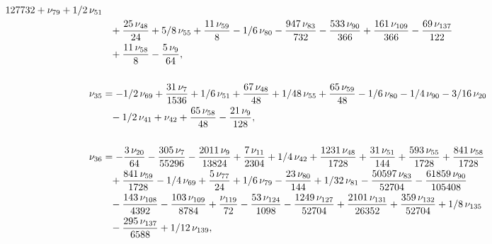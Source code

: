 \documentclass[a4paper,12pt, DIV=14, BCOR=5mm, twoside, headsepline, numbers=noenddot]{scrbook}
\begin{document}
\begin{align}
\begin{aligned}
{{{{127}}}{732}}+\nu_{{79}}+1/2\,\nu_{{51}}\\
 &\hphantom{=}+{\frac {25\,\nu_{{48}}}{24}}+
5/8\,\nu_{{55}}+{\frac {11\,\nu_{{59}}}{8}}-1/6\,\nu_{{80}}-{\frac {
947\,\nu_{{83}}}{732}}-{\frac {533\,\nu_{{90}}}{366}}+{\frac {161\,\nu
_{{109}}}{366}}-{\frac {69\,\nu_{{137}}}{122}}\\
 &\hphantom{=}+{\frac {11\,\nu_{{58}}
}{8}}-{\frac {5\,\nu_{{9}}}{64}}, \\
\\
\nu_{{35}}&=-1/2\,\nu_{{69}}+{\frac {
31\,\nu_{{7}}}{1536}}+1/6\,\nu_{{51}}+{\frac {67\,\nu_{{48}}}{48}}+1/
48\,\nu_{{55}}+{\frac {65\,\nu_{{59}}}{48}}-1/6\,\nu_{{80}}-1/4\,\nu_{
{90}}-3/16\,\nu_{{20}}\\
 &\hphantom{=}-1/2\,\nu_{{41}}+\nu_{{42}}+{\frac {65\,\nu_{{58
}}}{48}}-{\frac {21\,\nu_{{9}}}{128}}, \\
\\
\nu_{{36}}&=-{\frac {3\,\nu_{{20}
}}{64}}-{\frac {305\,\nu_{{7}}}{55296}}-{\frac {2011\,\nu_{{9}}}{13824
}}+{\frac {7\,\nu_{{11}}}{2304}}+1/4\,\nu_{{42}}+{\frac {1231\,\nu_{{
48}}}{1728}}+{\frac {31\,\nu_{{51}}}{144}}+{\frac {593\,\nu_{{55}}}{
1728}}+{\frac {841\,\nu_{{58}}}{1728}}\\
 &\hphantom{=}+{\frac {841\,\nu_{{59}}}{1728}}
-1/4\,\nu_{{69}}+{\frac {5\,\nu_{{77}}}{24}}+1/6\,\nu_{{79}}-{\frac {
23\,\nu_{{80}}}{144}}+1/32\,\nu_{{81}}-{\frac {50597\,\nu_{{83}}}{
52704}}-{\frac {61859\,\nu_{{90}}}{105408}}\\
 &\hphantom{=}-{\frac {143\,\nu_{{108}}}{
4392}}-{\frac {103\,\nu_{{109}}}{8784}}+{\frac {\nu_{{119}}}{72}}-{
\frac {53\,\nu_{{124}}}{1098}}-{\frac {1249\,\nu_{{127}}}{52704}}+{
\frac {2101\,\nu_{{131}}}{26352}}+{\frac {359\,\nu_{{132}}}{52704}}+1/
8\,\nu_{{135}}\\
 &\hphantom{=}-{\frac {295\,\nu_{{137}}}{6588}}+1/12\,\nu_{{139}},
\end{aligned}
\end{align}
\end{document}
